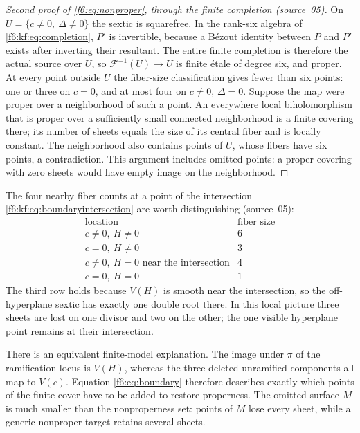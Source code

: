 \documentclass[11pt,a4paper]{article}
\theoremstyle{definition}
\newcommand{\F}{\mathcal F}
\newcommand{\src}[1]{\textup{(source~#1)}}
\begin{document}
\begin{proof}[Second proof of \eqref{f6:eq:nonproper}, through the finite
completion \src{05}]
On $U=\{c\ne0,\ \Delta\ne0\}$ the sextic is squarefree. In the rank-six
algebra of \eqref{f6:kf:eq:completion}, $P'$ is invertible, because a Bézout
identity between $P$ and $P'$ exists after inverting their resultant. The
entire finite completion is therefore the actual source over $U$, so
$\F^{-1}(U)\to U$ is finite \'etale of degree six, and proper. At every point
outside $U$ the fiber-size classification gives fewer than six points: one
or three on $c=0$, and at most four on $c\ne0$, $\Delta=0$. Suppose the map
were proper over a neighborhood of such a point. An everywhere local
biholomorphism that is proper over a sufficiently small connected
neighborhood is a finite covering there; its number of sheets equals the
size of its central fiber and is locally constant. The neighborhood also
contains points of $U$, whose fibers have six points, a contradiction. This
argument includes omitted points: a proper covering with zero sheets would
have empty image on the neighborhood.
\end{proof}

The four nearby fiber counts at a point of the intersection
\eqref{f6:kf:eq:boundaryintersection} are worth distinguishing \src{05}:
\[
\begin{array}{c|c}
\text{location}&\text{fiber size}\\\hline
c\ne0,\ H\ne0&6\\
c=0,\ H\ne0&3\\
c\ne0,\ H=0\text{ near the intersection}&4\\
c=0,\ H=0&1
\end{array}
\]
The third row holds because $V(H)$ is smooth near the intersection, so the
off-hyperplane sextic has exactly one double root there. In this local
picture three sheets are lost on one divisor and two on the other; the one
visible hyperplane point remains at their intersection.

There is an equivalent finite-model explanation. The image under $\pi$
of the ramification locus is $V(H)$, whereas the three deleted
unramified components all map to $V(c)$. Equation \eqref{f6:eq:boundary}
therefore describes exactly which points of the finite cover have to be
added to restore properness. The omitted surface $M$ is much smaller
than the nonproperness set: points of $M$ lose every sheet, while a
generic nonproper target retains several sheets.

\end{document}
